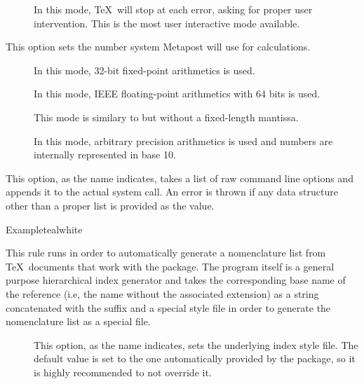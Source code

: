 \begin{description}
\begin{description}
\begin{description}
\item[] In this mode, \TeX\ will stop at each error, asking for proper user intervention. This is the most user interactive mode available.
\end{description}

\item[\abox{numbersystem}] This option sets the number system Metapost will use for calculations.

\begin{description}
\item[] In this mode, 32-bit fixed-point arithmetics is used.

\item[] In this mode, IEEE floating-point arithmetics with 64 bits is used.
\item[] This mode is similary to  but without a fixed-length mantissa.
\item[] In this mode, arbitrary precision arithmetics is used and numbers are internally represented in base 10.
\end{description}

\item[\abox{options}] This option, as the name indicates, takes a list of raw command line options and appends it to the actual system call. An error is thrown if any data structure other than a proper list is provided as the value.
\end{description}

\begin{codebox}{Example}{teal}{\icnote}{white}
\end{codebox}

\item[\rulebox{nomencl}]
This rule runs  in order to automatically generate a nomenclature list from \TeX\ documents that work with the  package. The program itself is a general purpose hierarchical index generator and takes the corresponding base name of the  reference (i.e, the name without the associated extension) as a string concatenated with the  suffix and a special style file in order to generate the nomenclature list as a special  file.

\begin{description}
\item[] This option, as the name indicates, sets the underlying index style file. The default value is set to the one automatically provided by the  package, so it is highly recommended to not override it.


\end{description}
\end{description}
